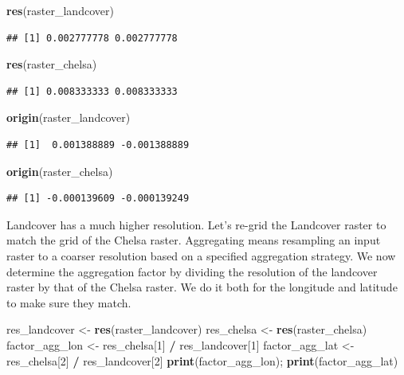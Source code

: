 \documentclass[
]{book}
\newenvironment{Shaded}{\begin{snugshade}}{\end{snugshade}}
\newcommand{\DecValTok}[1]{\textcolor[rgb]{0.00,0.00,0.81}{#1}}
\newcommand{\KeywordTok}[1]{\textcolor[rgb]{0.13,0.29,0.53}{\textbf{#1}}}
\newcommand{\NormalTok}[1]{#1}
\newcommand{\OperatorTok}[1]{\textcolor[rgb]{0.81,0.36,0.00}{\textbf{#1}}}
\newcommand{\StringTok}[1]{\textcolor[rgb]{0.31,0.60,0.02}{#1}}
\begin{document}
\begin{Shaded}
\begin{Highlighting}[]
\KeywordTok{res}\NormalTok{(raster_landcover)}
\end{Highlighting}
\end{Shaded}

\begin{verbatim}
## [1] 0.002777778 0.002777778
\end{verbatim}

\begin{Shaded}
\begin{Highlighting}[]
\KeywordTok{res}\NormalTok{(raster_chelsa)}
\end{Highlighting}
\end{Shaded}

\begin{verbatim}
## [1] 0.008333333 0.008333333
\end{verbatim}

\begin{Shaded}
\begin{Highlighting}[]
\KeywordTok{origin}\NormalTok{(raster_landcover)}
\end{Highlighting}
\end{Shaded}

\begin{verbatim}
## [1]  0.001388889 -0.001388889
\end{verbatim}

\begin{Shaded}
\begin{Highlighting}[]
\KeywordTok{origin}\NormalTok{(raster_chelsa)}
\end{Highlighting}
\end{Shaded}

\begin{verbatim}
## [1] -0.000139609 -0.000139249
\end{verbatim}

Landcover has a much higher resolution. Let's re-grid the Landcover raster to match the grid of the Chelsa raster. Aggregating means resampling an input raster to a coarser resolution based on a specified aggregation strategy. We now determine the aggregation factor by dividing the resolution of the landcover raster by that of the Chelsa raster. We do it both for the longitude and latitude to make sure they match.

\begin{Shaded}
\begin{Highlighting}[]
\NormalTok{res_landcover <-}\StringTok{ }\KeywordTok{res}\NormalTok{(raster_landcover)}
\NormalTok{res_chelsa <-}\StringTok{ }\KeywordTok{res}\NormalTok{(raster_chelsa)}
\NormalTok{factor_agg_lon <-}\StringTok{ }\NormalTok{res_chelsa[}\DecValTok{1}\NormalTok{] }\OperatorTok{/}\StringTok{ }\NormalTok{res_landcover[}\DecValTok{1}\NormalTok{]}
\NormalTok{factor_agg_lat <-}\StringTok{ }\NormalTok{res_chelsa[}\DecValTok{2}\NormalTok{] }\OperatorTok{/}\StringTok{ }\NormalTok{res_landcover[}\DecValTok{2}\NormalTok{]}
\KeywordTok{print}\NormalTok{(factor_agg_lon); }\KeywordTok{print}\NormalTok{(factor_agg_lat)}
\end{Highlighting}
\end{Shaded}
\end{document}
